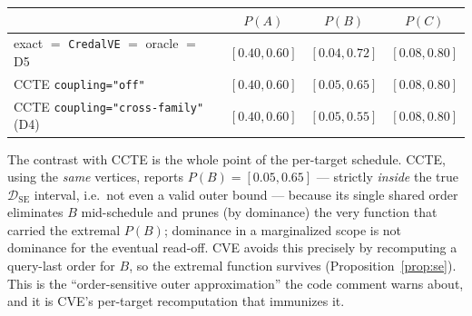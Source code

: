 \documentclass[11pt]{article}
\newcommand{\DSE}{\mathcal{D}_{\mathrm{SE}}}
\newcommand{\CVE}{\texttt{CredalVE}}
\begin{document}
\begin{center}\small
\begin{tabular}{lccc}
\toprule
 & $P(A)$ & $P(B)$ & $P(C)$ \\
\midrule
exact $=$ \CVE{} $=$ oracle $=$ D5 & $[0.40,0.60]$ & $\mathbf{[0.04,0.72]}$ & $[0.08,0.80]$ \\
CCTE \texttt{coupling="off"}          & $[0.40,0.60]$ & $\mathbf{[0.05,0.65]}$ & $[0.08,0.80]$ \\
CCTE \texttt{coupling="cross-family"} (D4) & $[0.40,0.60]$ & $\mathbf{[0.05,0.55]}$ & $[0.08,0.80]$ \\
\bottomrule
\end{tabular}
\end{center}
The contrast with CCTE is the whole point of the per-target schedule. CCTE, using the \emph{same}
vertices, reports $P(B)=[0.05,0.65]$ --- strictly \emph{inside} the true $\DSE$ interval, i.e.\ not
even a valid outer bound --- because its single shared order eliminates $B$ mid-schedule and prunes
(by dominance) the very function that carried the extremal $P(B)$; dominance in a marginalized scope
is not dominance for the eventual read-off. CVE avoids this precisely by recomputing a query-last
order for $B$, so the extremal function survives (Proposition~\ref{prop:se}). This is the
``order-sensitive outer approximation'' the code comment warns about, and it is CVE's per-target
recomputation that immunizes it.
\end{document}
